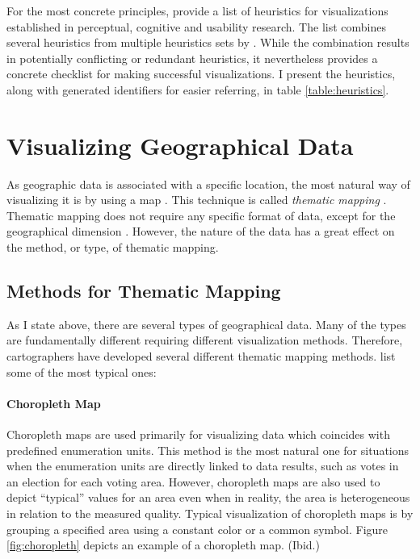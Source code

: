 For the most concrete principles, \citet{zuk_heuristics_2006} provide a list of heuristics for visualizations established in perceptual, cognitive and usability research. The list combines several heuristics from multiple heuristics sets by \citet{shneiderman_eyes_1996,zuk_theoretical_2006,amar_knowledge_2004}. While the combination results in potentially conflicting or redundant heuristics, it nevertheless provides a concrete checklist for making successful visualizations. I present the heuristics, along with generated identifiers for easier referring, in table \ref{table:heuristics}.

\section{Visualizing Geographical Data}

As geographic data is associated with a specific location, the most natural way of visualizing it is by using a map \citep[chap.~1]{kraak_cartographic_1998,kraak_cartography_2011}. This technique is called \emph{thematic mapping} \citep[chap.~1]{slocum_thematic_2014}. Thematic mapping does not require any specific format of data, except for the geographical dimension \citep[chap.~1]{kraak_cartography_2011}. However, the nature of the data has a great effect on the method, or type, of thematic mapping.

\subsection{Methods for Thematic Mapping}
\label{subsection:mappingmethods}

As I state above, there are several types of geographical data. Many of the types are fundamentally different requiring different visualization methods. Therefore, cartographers have developed several different thematic mapping methods. \citet[chap.~14-18]{slocum_thematic_2014} list some of the most typical ones:

\paragraph{Choropleth Map}

Choropleth maps are used primarily for visualizing data which coincides with predefined enumeration units. This method is the most natural one for situations when the enumeration units are directly linked to data results, such as votes in an election for each voting area. However, choropleth maps are also used to depict ``typical'' values for an area even when in reality, the area is heterogeneous in relation to the measured quality. Typical visualization of choropleth maps is by grouping a specified area using a constant color or a common symbol. Figure \ref{fig:choropleth} depicts an example of a choropleth map. (Ibid.)

